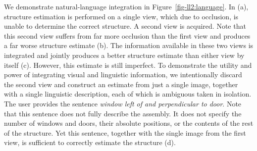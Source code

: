 We demonstrate natural-language integration in Figure~\ref{fig-ll2:language}.
%
In (a), structure estimation is performed on a single view, which due to
occlusion, is unable to determine the correct structure.
%
A second view is acquired.
%
Note that this second view suffers from far more occlusion than the first view
and produces a far worse structure estimate (b).
%
The information available in these two views is integrated and jointly produces
a better structure estimate than either view by itself
(c).
%
However, this estimate is still imperfect.
%
To demonstrate the utility and power of integrating visual and linguistic
information, we intentionally discard the second view and construct an estimate
from just a single image, together with a single linguistic description, each of
which is ambiguous taken in isolation.
%
The user provides the sentence \emph{window left of and perpendicular to door}.
%
Note that this sentence does not fully describe the assembly.
%
It does not specify the number of windows and doors, their absolute
positions, or the contents of the rest of the structure.
%
Yet this sentence, together with the single image from the first view, is
sufficient to correctly estimate the structure (d).

